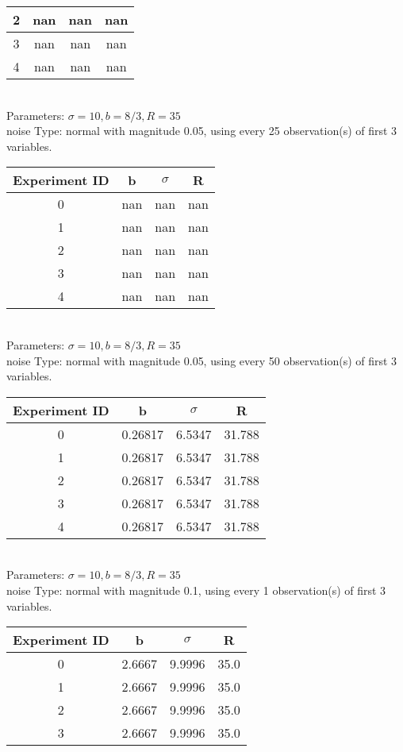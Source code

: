 \begin{multicols}{3}
\begin{tabular}{cccc}
 2 & nan & nan & nan\\ \hline 
 3 & nan & nan & nan\\ \hline 
 4 & nan & nan & nan\\ \hline 
 \end{tabular}\\
Parameters: $\sigma=10, b=8/3, R=35$\\
noise Type: normal with magnitude 0.05, using every 25 observation(s) of first 3 variables.\\
\begin{tabular}{cccc}
\hline Experiment ID & b & $\sigma$ & R \\ \hline 
0 & nan & nan & nan\\ \hline 
 1 & nan & nan & nan\\ \hline 
 2 & nan & nan & nan\\ \hline 
 3 & nan & nan & nan\\ \hline 
 4 & nan & nan & nan\\ \hline 
 \end{tabular}\\
Parameters: $\sigma=10, b=8/3, R=35$\\
noise Type: normal with magnitude 0.05, using every 50 observation(s) of first 3 variables.\\
\begin{tabular}{cccc}
\hline Experiment ID & b & $\sigma$ & R \\ \hline 
0 & 0.26817 & 6.5347 & 31.788\\ \hline 
 1 & 0.26817 & 6.5347 & 31.788\\ \hline 
 2 & 0.26817 & 6.5347 & 31.788\\ \hline 
 3 & 0.26817 & 6.5347 & 31.788\\ \hline 
 4 & 0.26817 & 6.5347 & 31.788\\ \hline 
 \end{tabular}\\
Parameters: $\sigma=10, b=8/3, R=35$\\
noise Type: normal with magnitude 0.1, using every 1 observation(s) of first 3 variables.\\
\begin{tabular}{cccc}
\hline Experiment ID & b & $\sigma$ & R \\ \hline 
0 & 2.6667 & 9.9996 & 35.0\\ \hline 
 1 & 2.6667 & 9.9996 & 35.0\\ \hline 
 2 & 2.6667 & 9.9996 & 35.0\\ \hline 
 3 & 2.6667 & 9.9996 & 35.0\\ \hline 

\end{tabular}
\end{multicols}

